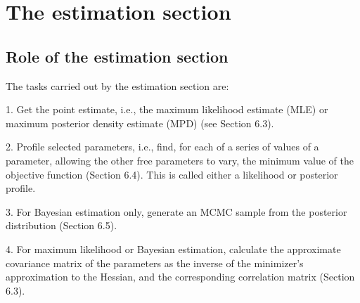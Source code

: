 \section{The estimation section\label{sec:estimation-section}}

\subsection{Role of the estimation section\label{sec:role-of-the-estimation-section}}

The tasks carried out by the estimation section are: 

1. Get the point estimate, i.e., the maximum likelihood estimate (MLE) or maximum posterior density estimate (MPD) (see Section 6.3).

2. Profile selected parameters, i.e., find, for each of a series of values of a parameter, allowing the other free parameters to vary, the minimum value of the objective function (Section 6.4). This is called either a likelihood or posterior profile. 

3. For Bayesian estimation only, generate an MCMC sample from the posterior distribution (Section 6.5).

4. For maximum likelihood or Bayesian estimation, calculate the approximate covariance matrix of the parameters as the inverse of the minimizer\textquoteright{}s approximation to the Hessian, and the corresponding correlation matrix (Section 6.3).
